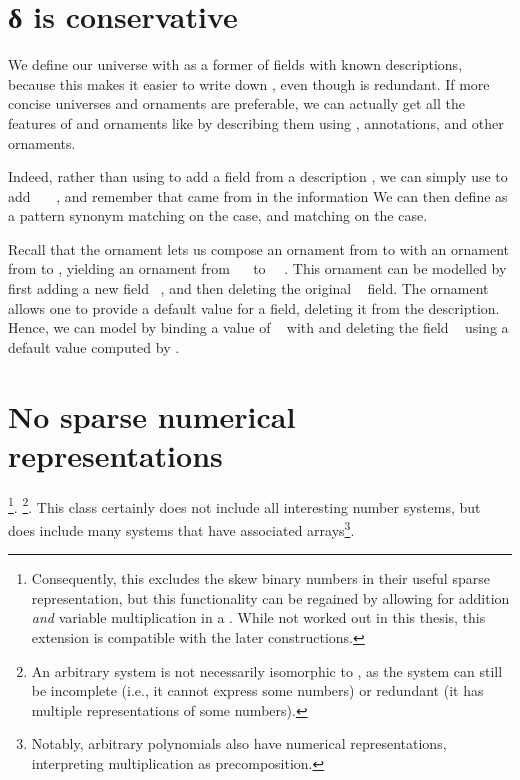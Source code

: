 \section{δ is conservative}\label{sec:redundant-delta}
We define our universe  with  as a former of fields with known descriptions, because this makes it easier to write down , even though  is redundant. If more concise universes and ornaments are preferable, we can actually get all the features of  and ornaments like  by describing them using , annotations, and other ornaments.

Indeed, rather than using  to add a field from a description , we can simply use  to add \ \AV{=}\ \ , and remember that  came from  in the information
We can then define  as a pattern synonym matching on the  case, and  matching on the  case.

Recall that the ornament  lets us compose an ornament from  to  with an ornament from  to , yielding an ornament from \ \  to \ \ . This ornament can be modelled by first adding a new field \ , and then deleting the original \  field. The ornament  \cite{kophd} allows one to provide a default value for a field, deleting it from the description. Hence, we can model  by binding a value  of \  with  and deleting the field \  using a default value computed by .


\section{No sparse numerical representations}\label{sec:discussion-no-sparse}
\begin{outline}
\footnote{Consequently, this excludes the skew binary numbers \cite{oka95b} in their useful sparse representation, but this functionality can be regained by allowing for addition \emph{and} variable multiplication in a . While not worked out in this thesis, this extension is compatible with the later constructions.}.
\footnote{An arbitrary  system is not necessarily isomorphic to \bN{}, as the system can still be incomplete (i.e., it cannot express some numbers) or redundant (it has multiple representations of some numbers).}. This class certainly does not include all interesting number systems, but does include many systems that have associated arrays\footnote{Notably, arbitrary polynomials also have numerical representations, interpreting multiplication as precomposition.}. 
\end{outline}
    



